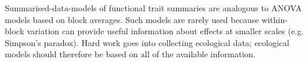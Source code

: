 \documentclass[12pt]{ecology}
\begin{document}




Summarised-data-models of functional trait summaries are analogous to ANOVA models based on block averages.  Such models are rarely used because within-block variation can provide useful information about effects at smaller scales (e.g. Simpson's paradox).  Hard work goes into collecting ecological data; ecological models should therefore be based on all of the available information.




\end{document}
